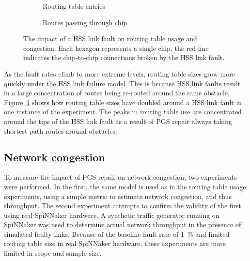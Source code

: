 			\begin{figure}
				\center
				\begin{subfigure}{0.48\linewidth}
					\center
					
					\caption{Routing table entries}
					\label{fig:hss-link-routing-table-usage}
				\end{subfigure}
				\begin{subfigure}{0.48\linewidth}
					\center
					
					\caption{Routes passing through chip}
					\label{fig:hss-link-resource-usage}
				\end{subfigure}
				
				\caption{The impact of a HSS link fault on routing table usage and
				congestion. Each hexagon represents a single chip, the red line
				indicates the chip-to-chip connections broken by the HSS link fault.}
				\label{fig:hss-link-usage}
			\end{figure}
			
			As the fault rates climb to more extreme levels, routing table sizes grow
			more quickly under the HSS link failure model. This is because HSS link
			faults result in a large concentration of routes being re-routed around
			the same obstacle. Figure~\ref{fig:hss-link-routing-table-usage} shows
			how routing table sizes have doubled around a HSS link fault in one
			instance of the experiment. The peaks in routing table use are
			concentrated around the tips of the HSS link fault as a result of PGS
			repair always taking shortest path routes around obstacles.
		
		\subsection{Network congestion}
			
			To measure the impact of PGS repair on network congestion, two
			experiments were performed. In the first, the same model is used as in
			the routing table usage experiments, using a simple metric to estimate
			network congestion, and thus throughput. The second experiment attempts
			to confirm the validity of the first using real SpiNNaker hardware. A
			synthetic traffic generator running on SpiNNaker was used to determine
			actual network throughput in the presence of simulated faulty links.
			Because of the baseline fault rate of \SI{1}{\percent} and limited
			routing table size in real SpiNNaker hardware, these experiments are more
			limited in scope and sample size.
			
